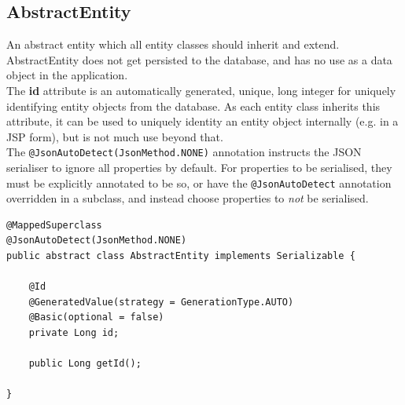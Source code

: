 \clearpage
\subsection{AbstractEntity} An abstract entity which all entity classes should inherit and extend. AbstractEntity does not get persisted to the database, and has no use as a data object in the application.
\\The \textbf{id} attribute is an automatically generated, unique, long integer for uniquely identifying entity objects from the database. As each entity class inherits this attribute, it can be used to uniquely identity an entity object internally (e.g. in a JSP form), but is not much use beyond that.
\\The \texttt{@JsonAutoDetect(JsonMethod.NONE)} annotation instructs the JSON serialiser to ignore all properties by default. For properties to be serialised, they must be explicitly annotated to be so, or have the \texttt{@JsonAutoDetect} annotation overridden in a subclass, and instead choose properties to \textit{not} be serialised.
\begin{small}\begin{verbatim}
@MappedSuperclass
@JsonAutoDetect(JsonMethod.NONE)
public abstract class AbstractEntity implements Serializable {

    @Id
    @GeneratedValue(strategy = GenerationType.AUTO)
    @Basic(optional = false)
    private Long id;
    
    public Long getId();

}
\end{verbatim}\end{small}

